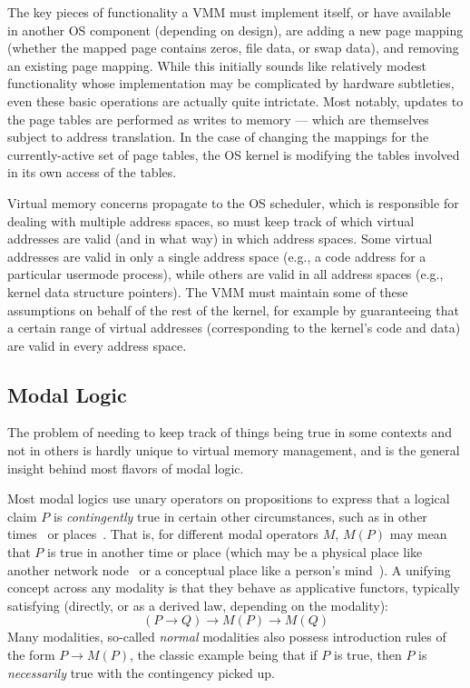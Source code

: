 \documentclass[acmsmall,screen,nonacm]{acmart}
\begin{document}
The key pieces of functionality a VMM must implement itself, or have available in another OS component (depending on 
design), are
adding a new page mapping (whether the mapped page contains zeros, file data, or swap data), and removing an existing 
page mapping.
While this initially sounds like relatively modest functionality whose implementation may be complicated by hardware 
subtleties, even these basic operations are actually quite intrictate.
Most notably, updates to the page tables are performed as writes to memory --- which are themselves subject to address translation.
In the case of changing the mappings for the currently-active set of page tables, the OS kernel is modifying the tables involved in its
own access of the tables.

%
%
%
%
%
%
%
%
%
%
%
%
%
%
%
%
%
%
%
%
%
%

%
%
%
%
%
%
%
%
%

Virtual memory concerns propagate to the OS scheduler, which is responsible for dealing with multiple 
address spaces, so must keep track of which virtual addresses are valid (and in what way) in which address spaces. 
Some virtual addresses are valid in only a single address space (e.g., a code address for a particular usermode 
process), while others are valid in all address spaces (e.g., kernel data structure pointers). 
The VMM must maintain some of these assumptions on behalf of the rest of the kernel, for example by guaranteeing that 
a certain range of virtual addresses (corresponding to the kernel's code and data) are valid in every address space.

\subsection{Modal Logic}
\label{sec:backgroundonmodallogic}
The problem of needing to keep track of things being true in some contexts and not in others is hardly unique to virtual 
memory management, and is the general insight behind most flavors of modal logic.

Most modal logics use unary operators on propositions to express that a logical claim $P$ is \emph{contingently} true 
in certain other circumstances, such as in other times~\cite{pnueli1977temporal} or places~\cite{gordon2019modal}. That is, for 
different modal operators $M$, $M(P)$ may mean that $P$ is true in another time or place (which may be a physical place 
like another network node~\cite{murphy2008type,gordon2019modal} or a conceptual place like a person's 
mind~\cite{hintikka1962knowledge}). A unifying concept across any modality is that they behave as applicative functors, 
typically satisfying (directly, or as a derived law, depending on the modality):
\[ (P\rightarrow Q) \rightarrow M(P) \rightarrow M(Q)\]
%
%
%
%
%
Many modalities, so-called \emph{normal} modalities also possess introduction rules of the form $P\rightarrow M(P)$, 
the classic example being that if $P$ is true, then $P$ is \emph{necessarily} true with the contingency picked up.%
\end{document}
